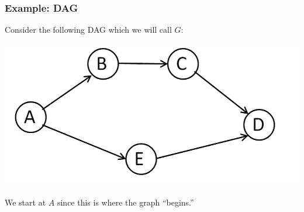 \documentclass[letterpaper]{article}
\begin{document}
\subsubsection{Example: DAG}
Consider the following DAG which we will call $G$:
\begin{center}
    \includegraphics[scale=0.4]{../assets/dag_ex.png}
\end{center}
We start at $A$ since this is where the graph ``begins.''
\end{document}
